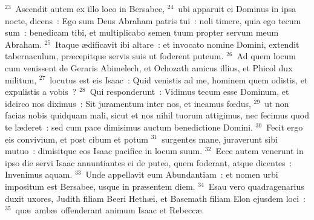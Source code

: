 ${}^{23}$~Ascendit autem ex illo loco in Bersabee,
${}^{24}$~ubi apparuit ei Dominus in ipsa nocte, dicens~: Ego sum Deus Abraham patris tui~: noli timere, quia ego tecum sum~: benedicam tibi, et multiplicabo semen tuum propter servum meum Abraham.
${}^{25}$~Itaque \ae dificavit ibi altare~: et invocato nomine Domini, extendit tabernaculum, pr\ae cepitque servis suis ut foderent puteum.
${}^{26}$~Ad quem locum cum venissent de Geraris Abimelech, et Ochozath amicus illius, et Phicol dux militum,
${}^{27}$~locutus est eis Isaac~: Quid venistis ad me, hominem quem odistis, et expulistis a vobis~?
${}^{28}$~Qui responderunt~: Vidimus tecum esse Dominum, et idcirco nos diximus~: Sit juramentum inter nos, et ineamus fœdus,
${}^{29}$~ut non facias nobis quidquam mali, sicut et nos nihil tuorum attigimus, nec fecimus quod te l\ae deret~: sed cum pace dimisimus auctum benedictione Domini.
${}^{30}$~Fecit ergo eis convivium, et post cibum et potum
${}^{31}$~surgentes mane, juraverunt sibi mutuo~: dimisitque eos Isaac pacifice in locum suum.
${}^{32}$~Ecce autem venerunt in ipso die servi Isaac annuntiantes ei de puteo, quem foderant, atque dicentes~: Invenimus aquam.
${}^{33}$~Unde appellavit eum Abundantiam~: et nomen urbi impositum est Bersabee, usque in pr\ae sentem diem.
${}^{34}$~Esau vero quadragenarius duxit uxores, Judith filiam Beeri Heth\ae i, et Basemath filiam Elon ejusdem loci~:
${}^{35}$~qu\ae\ amb\ae\ offenderant animum Isaac et Rebecc\ae .

